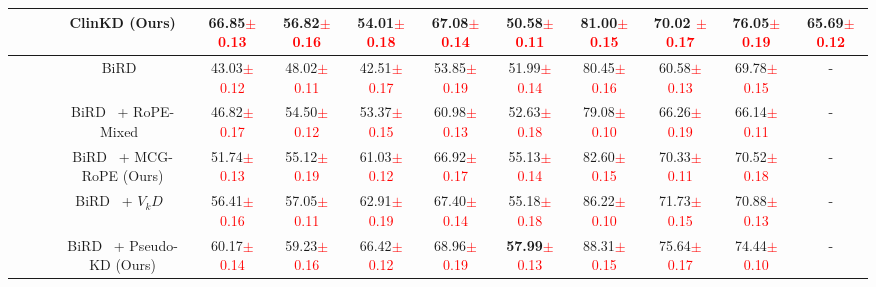 \begin{table*}[t]
{\begin{tabular}{c|c|c|cccccccc|c}
\rowcolor[RGB]{255,245,235}
\cellcolor{white}\multirow{-6}{*}{\textbf{MIA}}  &\cellcolor{white} \multirow{-6}{*}{mBMR~\cite{huang2024BiRD}} &ClinKD (Ours)& \textbf{66.85}\textcolor{red}{$\pm$0.13} & \textbf{56.82}\textcolor{red}{$\pm$0.16} & \textbf{54.01}\textcolor{red}{$\pm$0.18} & \textbf{67.08}\textcolor{red}{$\pm$0.14} & \textbf{50.58}\textcolor{red}{$\pm$0.11} & \textbf{81.00}\textcolor{red}{$\pm$0.15} & \textbf{70.02} \textcolor{red}{$\pm$0.17} & 76.05\textcolor{red}{$\pm$0.19} & \textbf{65.69}\textcolor{red}{$\pm$0.12} \\ \midrule

~ & ~ &BiRD~\cite{huang2024BiRD}& 43.03\textcolor{red}{$\pm$0.12} & 48.02\textcolor{red}{$\pm$0.11} & 42.51\textcolor{red}{$\pm$0.17} & 53.85\textcolor{red}{$\pm$0.19} & 51.99\textcolor{red}{$\pm$0.14} & 80.45\textcolor{red}{$\pm$0.16} & 60.58\textcolor{red}{$\pm$0.13} & 69.78\textcolor{red}{$\pm$0.15} &  -     \\ 
~ & ~ &BiRD~\cite{huang2024BiRD} + RoPE-Mixed~\cite{heo2024rotarypositionembeddingvision}& 46.82\textcolor{red}{$\pm$0.17} & 54.50\textcolor{red}{$\pm$0.12} & 53.37\textcolor{red}{$\pm$0.15} & 60.98\textcolor{red}{$\pm$0.13} & 52.63\textcolor{red}{$\pm$0.18} & 79.08\textcolor{red}{$\pm$0.10} & 66.26\textcolor{red}{$\pm$0.19} & 66.14\textcolor{red}{$\pm$0.11} &  -     \\ 
\rowcolor[RGB]{237,238,254}
\cellcolor{white}~ & \cellcolor{white}~ &BiRD~\cite{huang2024BiRD} + MCG-RoPE (Ours)& 51.74\textcolor{red}{$\pm$0.13} & 55.12\textcolor{red}{$\pm$0.19} & 61.03\textcolor{red}{$\pm$0.12} & 66.92\textcolor{red}{$\pm$0.17} & 55.13\textcolor{red}{$\pm$0.14} & 82.60\textcolor{red}{$\pm$0.15} & 70.33\textcolor{red}{$\pm$0.11} & 70.52\textcolor{red}{$\pm$0.18} &  -     \\ 
~ & ~ &BiRD~\cite{huang2024BiRD} + $V_{k}D$~\cite{Miles_2024_CVPR} & 56.41\textcolor{red}{$\pm$0.16} & 57.05\textcolor{red}{$\pm$0.11} & 62.91\textcolor{red}{$\pm$0.19} & 67.40\textcolor{red}{$\pm$0.14} & 55.18\textcolor{red}{$\pm$0.18} & 86.22\textcolor{red}{$\pm$0.10} & 71.73\textcolor{red}{$\pm$0.15} & 70.88\textcolor{red}{$\pm$0.13} &  -     \\ 
\rowcolor[RGB]{237,238,254}
\cellcolor{white}~ &\cellcolor{white} ~ &BiRD~\cite{huang2024BiRD} + Pseudo-KD (Ours)& 60.17\textcolor{red}{$\pm$0.14} & 59.23\textcolor{red}{$\pm$0.16} & 66.42\textcolor{red}{$\pm$0.12} & 68.96\textcolor{red}{$\pm$0.19} & \textbf{57.99}\textcolor{red}{$\pm$0.13} & 88.31\textcolor{red}{$\pm$0.15} & 75.64\textcolor{red}{$\pm$0.17} & 74.44\textcolor{red}{$\pm$0.10} &  -     \\ 

\end{tabular}}
\end{table*}
